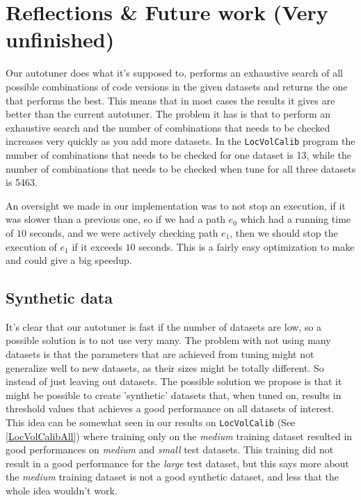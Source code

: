 \section{Reflections \& Future work (Very unfinished)}

Our autotuner does what it's supposed to, performs an exhaustive search of all
possible combinations of code versions in the given datasets and returns the
one that performs the best. This means that in most cases the results it gives
are better than the current autotuner. The problem it has is that to perform an
exhaustive search and the number of combinations that needs to be checked increases
very quickly as you add more datasets. In the \texttt{LocVolCalib} program the
number of combinations that needs to be checked for one dataset is 13, while
the number of combinations that needs to be checked when tune for all
three datasets is 5463. 

An oversight we made in our implementation was to not stop an execution, if it was slower than a previous one, so if we had a path $e_0$ which had a running time of $10$ seconds, and we were actively checking path $e_1$, then we should stop the execution of $e_1$ if it exceeds $10$ seconds. This is a fairly easy optimization to make and could give a big speedup. 

\subsection{Synthetic data}
It's clear that our autotuner is fast if the number of datasets are low, so a
possible solution is to not use very many. The problem with not using many
datasets is that the parameters that are achieved from tuning might not
generalize well to new datasets, as their sizes might be totally different. So
instead of just leaving out datasets. The possible solution we propose is that
it might be possible to create 'synthetic' datasets that, when tuned on,
results in threshold values that achieves a good performance on all datasets of
interest. 
This idea can be somewhat seen in our results on \texttt{LocVolCalib} (See \ref{LocVolCalibAll})
where training only on the \textit{medium} training  dataset resulted in good
performances on \textit{medium} and \textit{small} test datasets. This training
did not result in a good performance for the \textit{large} test dataset, but
this says more about the \textit{medium} training dataset is not a good
synthetic dataset, and less that the whole idea wouldn't work.

